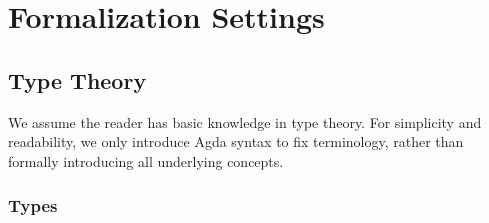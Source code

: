 \chapter{Formalization Settings}

\section{Type Theory}

We assume the reader has basic knowledge in type theory. For simplicity and readability, we only introduce Agda syntax to fix terminology, rather than formally introducing all underlying concepts.

\subsection*{Types}
